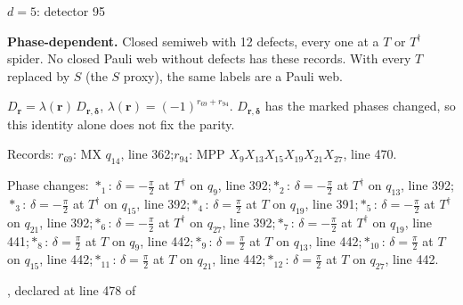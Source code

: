 \label{d5_det095}
{\Large $d=5$: detector 95}\par
\textbf{Phase-dependent.} Closed semiweb with 12 defects, every one at a $T$ or $T^\dagger$ spider. No closed Pauli web without defects has these records. With every $T$ replaced by $S$ (the $S$ proxy), the same labels are a Pauli web.
\begin{center}
\end{center}
\vspace{-1mm}
$D_{\boldsymbol r}=\lambda(\boldsymbol r)\,D_{\boldsymbol r,\boldsymbol\delta}$, \quad $\lambda(\boldsymbol r)=(-1)^{r_{69}+r_{94}}$. \qquad $D_{\boldsymbol r,\boldsymbol\delta}$ has the marked phases changed, so this identity alone does not fix the parity.
\par\smallskip\begin{minipage}{.98\linewidth}\small Records: $r_{69}$: MX $q_{14}$, line 362;\quad $r_{94}$: MPP $X_{9}X_{13}X_{15}X_{19}X_{21}X_{27}$, line 470.\end{minipage}
\par\smallskip\begin{minipage}{.98\linewidth}\small Phase changes: $\ast_{1}$: $\delta=-\frac{\pi}{2}$ at $T^\dagger$ on $q_{9}$, line 392;\quad $\ast_{2}$: $\delta=-\frac{\pi}{2}$ at $T^\dagger$ on $q_{13}$, line 392;\quad $\ast_{3}$: $\delta=-\frac{\pi}{2}$ at $T^\dagger$ on $q_{15}$, line 392;\quad $\ast_{4}$: $\delta=\frac{\pi}{2}$ at $T$ on $q_{19}$, line 391;\quad $\ast_{5}$: $\delta=-\frac{\pi}{2}$ at $T^\dagger$ on $q_{21}$, line 392;\quad $\ast_{6}$: $\delta=-\frac{\pi}{2}$ at $T^\dagger$ on $q_{27}$, line 392;\quad $\ast_{7}$: $\delta=-\frac{\pi}{2}$ at $T^\dagger$ on $q_{19}$, line 441;\quad $\ast_{8}$: $\delta=\frac{\pi}{2}$ at $T$ on $q_{9}$, line 442;\quad $\ast_{9}$: $\delta=\frac{\pi}{2}$ at $T$ on $q_{13}$, line 442;\quad $\ast_{10}$: $\delta=\frac{\pi}{2}$ at $T$ on $q_{15}$, line 442;\quad $\ast_{11}$: $\delta=\frac{\pi}{2}$ at $T$ on $q_{21}$, line 442;\quad $\ast_{12}$: $\delta=\frac{\pi}{2}$ at $T$ on $q_{27}$, line 442.\end{minipage}
\vfill
{\footnotesize\texttt{}, declared at line 478 of \texttt{}}
\newpage

